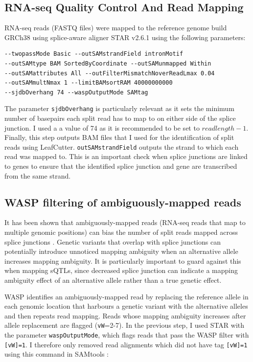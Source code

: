 \subsection{RNA-seq Quality Control And Read Mapping}
RNA-seq reads (FASTQ files) were mapped to the reference genome build GRCh38 using splice-aware aligner STAR v2.6.1 \cite{Dobin2013-hs} using the following parameters: 

\begin{verbatim}
--twopassMode Basic --outSAMstrandField intronMotif
--outSAMtype BAM SortedByCoordinate --outSAMunmapped Within
--outSAMattributes All --outFilterMismatchNoverReadLmax 0.04
--outSAMmultNmax 1 --limitBAMsortRAM 40000000000
--sjdbOverhang 74 --waspOutputMode SAMtag
\end{verbatim}
The parameter \Verb_sjdbOverhang_ is particularly relevant as it sets the minimum number of basepairs each split read has to map to on either side of the splice junction. I used a a value of 74 as it is recommended to be set to $read length -1$. Finally, this step outputs BAM files that I used for the identification of split reads using LeafCutter. \Verb_outSAMstrandField_ outputs the strand to which each read was mapped to. This is an important check when splice junctions are linked to genes to ensure that the identified splice junction and gene are transcribed from the same strand. 

\subsection{WASP filtering of ambiguously-mapped reads}
It has been shown that ambiguously-mapped reads (RNA-seq reads that map to multiple genomic positions) can bias the number of split reads mapped across splice junctions \cite{Van_de_Geijn2015-lb}. Genetic variants that overlap with splice junctions can potentially introduce unnoticed mapping ambiguity when an alternative allele increases mapping ambiguity. It is particularly important to guard against this when mapping sQTLs, since decreased splice junction can indicate a mapping ambiguity effect of an alternative allele rather than a true genetic effect.

WASP \cite{Van_de_Geijn2015-lb} identifies an ambiguously-mapped read by replacing the reference allele in each genomic location that harbours a genetic variant with the alternative alleles and then repeats read mapping. Reads whose mapping ambiguity increases after allele replacement are flagged (\Verb_vW_=2-7). In the previous step, I used STAR with the parameter \Verb_waspOutputMode_, which flags reads that pass the WASP filter with \Verb_[vW]=1_.  I therefore only removed read alignments which did not have tag \Verb_[vW]=1_ using this command in SAMtools \cite{Li2009-yk}:

